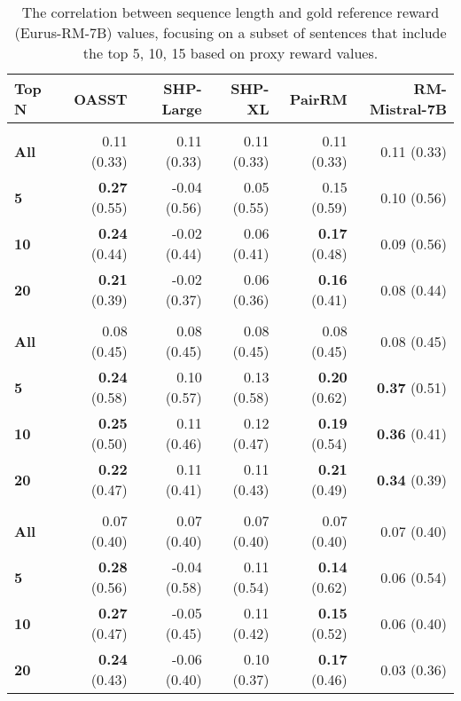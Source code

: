 \begin{table}[ht]
\centering
\small
\caption{The correlation between sequence length and gold reference reward (Eurus-RM-7B) values, focusing on a subset of sentences that include the top {5, 10, 15} based on proxy reward values.}\label{table:gold_corelation}
\begin{tabular}{@{}lrrrrr@{}}
\toprule
 \textbf{Top N} &\textbf{OASST} & \textbf{SHP-Large} & \textbf{SHP-XL} & \textbf{PairRM} & \textbf{RM-Mistral-7B}\\ \midrule
\rowcolor[HTML]{EFEFEF} 
\multicolumn{6}{c}{\textbf{AlpacaFarm}} \\ \midrule
\textbf{All} &0.11 (0.33) & 0.11 (0.33)&  0.11 (0.33) & 0.11 (0.33) & 0.11 (0.33)  \\\midrule
\textbf{5} &\textbf{0.27} (0.55) & -0.04 (0.56)&  0.05 (0.55) & 0.15 (0.59) & 0.10 (0.56)  \\\midrule
\textbf{10} &\textbf{0.24} (0.44) & -0.02 (0.44)&  0.06 (0.41) & \textbf{0.17} (0.48) & 0.09 (0.56)  \\\midrule
\textbf{20} &\textbf{0.21} (0.39) & -0.02 (0.37)&  0.06 (0.36) & \textbf{0.16} (0.41) & 0.08 (0.44)  \\\midrule
\rowcolor[HTML]{EFEFEF} 
\multicolumn{6}{c}{\textbf{Harmlessness}} \\ \midrule
\textbf{All} &0.08 (0.45) & 0.08 (0.45)&  0.08 (0.45) & 0.08 (0.45) & 0.08 (0.45)  \\\midrule
\textbf{5} &\textbf{0.24} (0.58) & 0.10 (0.57)&  0.13 (0.58) & \textbf{0.20} (0.62) & \textbf{0.37} (0.51)  \\\midrule
\textbf{10} &\textbf{0.25} (0.50) & 0.11 (0.46)&  0.12 (0.47) & \textbf{0.19} (0.54) & \textbf{0.36} (0.41)  \\\midrule
\textbf{20} &\textbf{0.22} (0.47) & 0.11 (0.41)&  0.11 (0.43) & \textbf{0.21} (0.49) & \textbf{0.34} (0.39)  \\\midrule
\rowcolor[HTML]{EFEFEF} 
\multicolumn{6}{c}{\textbf{Helpfulness}} \\ \midrule
\textbf{All} &0.07 (0.40) & 0.07 (0.40)&  0.07 (0.40) & 0.07 (0.40) & 0.07 (0.40)  \\\midrule
\textbf{5} &\textbf{0.28} (0.56) & -0.04 (0.58)&  0.11 (0.54) & \textbf{0.14} (0.62) & 0.06 (0.54)  \\\midrule
\textbf{10} &\textbf{0.27} (0.47) & -0.05 (0.45)&  0.11 (0.42) & \textbf{0.15} (0.52) & 0.06 (0.40)  \\\midrule
\textbf{20} &\textbf{0.24} (0.43) & -0.06 (0.40)&  0.10 (0.37) & \textbf{0.17} (0.46) & 0.03 (0.36)  \\
 \bottomrule
\end{tabular}
\label{tab:diff2}
\end{table}

